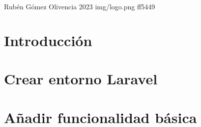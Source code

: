 \documentclass{\ClassPath/yukibook}
\begin{document}
    {Rubén Gómez Olivencia}  %
    {2023}    %
    {} %
    {} %
    {} %
    {img/logo.png} %
    {ff5449}
    {} %

    \coverpage
    \graphicspath{{../../yukibook.cls/}}
    \licensepage
    \tableofcontents

    \graphicspath{{img/}}

    \part{Introducción}
    
    

    \part{Crear entorno Laravel}
    

    

    \part{Añadir funcionalidad básica}
    


\end{document}

